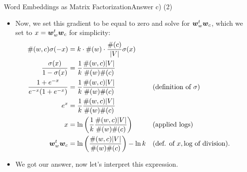 \documentclass[t]{beamer}
\begin{document}
\begin{frame}{Word Embeddings as Matrix Factorization}{Answer c) (2)}
    \begin{itemize}
        \item Now, we set this gradient to be equal to zero and solve for
              ${\boldsymbol{w}}_{w}^t{\boldsymbol{w}}_{c}$, which we set to $x = {\boldsymbol{w}}_{w}^t{\boldsymbol{w}}_{c}$ for
              simplicity:
              {\tiny
              \begin{align*}
                  \#(w,c)\sigma(-x)                 & = k\cdot\#(w)\cdot\frac{\#(c)}{|V|}\sigma(x)                                                                  \\
                  \frac{\sigma(x)}{1 - \sigma(x)}   & = \frac{1}{k}\frac{\#(w,c)|V|}{\#(w)\#(c)}                                                                    \\
                  \frac{1+e^{-x}}{e^{-x}(1+e^{-x})} & = \frac{1}{k}\frac{\#(w,c)|V|}{\#(w)\#(c)}                  &  & (\text{definition of }\sigma)                \\
                  e^{x}                             & = \frac{1}{k}\frac{\#(w,c)|V|}{\#(w)\#(c)}                                                                    \\
                  x                                 & = \ln\left(\frac{1}{k}\frac{\#(w,c)|V|}{\#(w)\#(c)}\right) &  & (\text{applied logs})                        \\
                  {\boldsymbol{w}}_{w}^t{\boldsymbol{w}}_{c}                  & = \ln\left(\frac{\#(w,c)|V|}{\#(w)\#(c)}\right) - \ln k   &  & (\text{def. of } x, \text{log of division}). \\
              \end{align*}
              }
        \item We got our answer, now let's interpret this expression.
    \end{itemize}
\end{frame}
\end{document}
